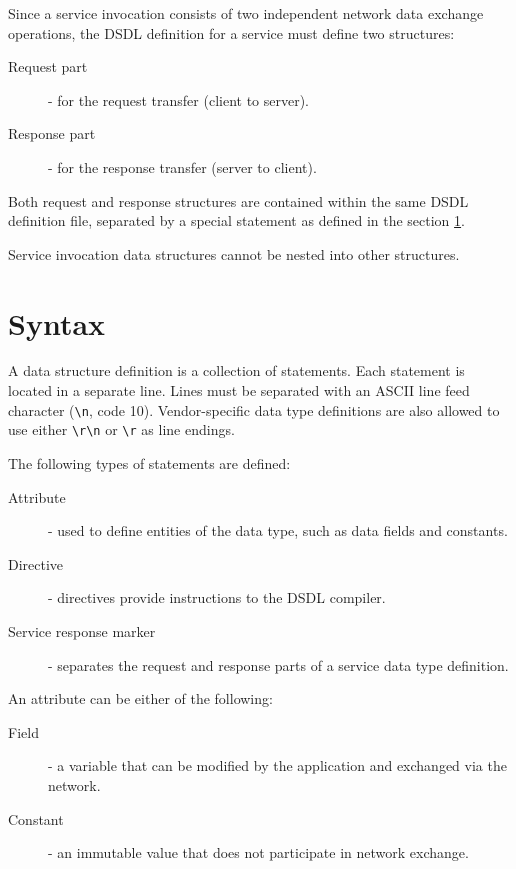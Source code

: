 Since a service invocation consists of two independent network data exchange operations,
the DSDL definition for a service must define two structures:

\begin{description}
    \item[Request part] - for the request transfer (client to server).
    \item[Response part] - for the response transfer (server to client).
\end{description}

Both request and response structures are contained within the same DSDL definition file,
separated by a special statement as defined in the section \ref{sec:dsdl_syntax}.

Service invocation data structures cannot be nested into other structures.

\section{Syntax}\label{sec:dsdl_syntax}

A data structure definition is a collection of statements.
Each statement is located in a separate line.
Lines must be separated with an ASCII line feed character (\verb|\n|, code 10).
Vendor-specific data type definitions are also allowed to use either \verb|\r\n| or \verb|\r|
as line endings.

The following types of statements are defined:

\begin{description}
    \item[Attribute] - used to define entities of the data type, such as data fields and constants.
    \item[Directive] - directives provide instructions to the DSDL compiler.
    \item[Service response marker] - separates the request and response parts of a service data type definition.
\end{description}

An attribute can be either of the following:

\begin{description}
    \item[Field] - a variable that can be modified by the application and exchanged via the network.
    \item[Constant] - an immutable value that does not participate in network exchange.
\end{description}

